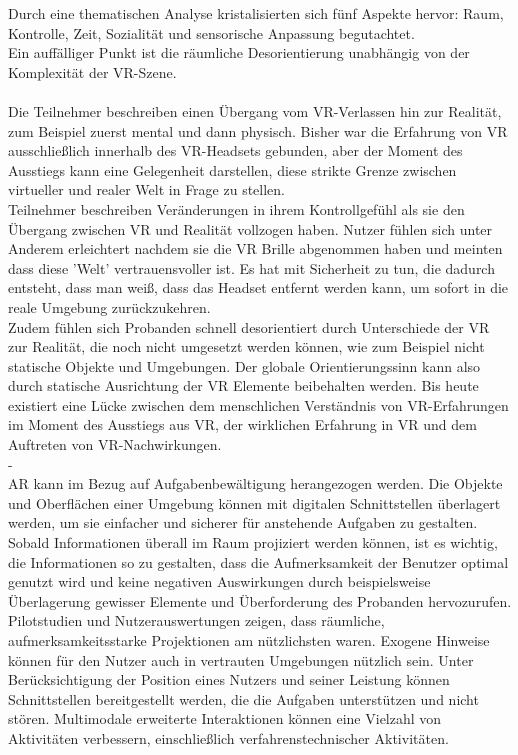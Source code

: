 Durch eine thematischen Analyse kristalisierten sich fünf Aspekte hervor: Raum, Kontrolle, Zeit, Sozialität und sensorische Anpassung begutachtet.\\
Ein auffälliger Punkt ist die räumliche Desorientierung unabhängig von der Komplexität der VR-Szene.\\ \\
 Die Teilnehmer beschreiben einen Übergang vom VR-Verlassen hin zur Realität, zum Beispiel zuerst mental und dann physisch.
Bisher war die Erfahrung von VR ausschließlich innerhalb des VR-Headsets gebunden, aber der Moment des Ausstiegs kann eine Gelegenheit darstellen, diese strikte Grenze zwischen virtueller und realer Welt in Frage zu stellen.\\
Teilnehmer beschreiben Veränderungen in ihrem Kontrollgefühl als sie den Übergang zwischen VR und Realität vollzogen haben. Nutzer fühlen sich unter Anderem erleichtert nachdem sie die VR Brille abgenommen haben und meinten dass diese 'Welt' vertrauensvoller ist. Es hat mit Sicherheit zu tun, die dadurch entsteht, dass man weiß, dass das Headset entfernt werden kann, um sofort in die reale Umgebung zurückzukehren.\\
Zudem fühlen sich Probanden schnell desorientiert durch Unterschiede der VR zur Realität, die noch nicht umgesetzt werden können, wie zum Beispiel nicht statische Objekte und Umgebungen. Der globale Orientierungssinn kann also durch statische Ausrichtung der VR Elemente beibehalten werden.
Bis heute existiert eine Lücke zwischen dem menschlichen Verständnis von VR-Erfahrungen im Moment des Ausstiegs aus VR, der wirklichen Erfahrung in VR und dem Auftreten von VR-Nachwirkungen. \cite{knibbe2018dream}\\


-\cite{bonanni2005attention}\\
AR kann im Bezug auf Aufgabenbewältigung herangezogen werden. 
Die Objekte und Oberflächen einer Umgebung können mit digitalen Schnittstellen überlagert werden, um sie einfacher und sicherer für anstehende Aufgaben zu gestalten. Sobald Informationen überall im Raum projiziert werden können, ist es wichtig, die Informationen so zu gestalten, dass die Aufmerksamkeit der Benutzer optimal genutzt wird und keine negativen Auswirkungen durch beispielsweise Überlagerung gewisser Elemente und Überforderung des Probanden hervozurufen. Pilotstudien und Nutzerauswertungen zeigen, dass räumliche, aufmerksamkeitsstarke Projektionen am nützlichsten waren. Exogene Hinweise können für den Nutzer auch in vertrauten Umgebungen nützlich sein. Unter Berücksichtigung der Position eines Nutzers und seiner Leistung können Schnittstellen bereitgestellt werden, die die Aufgaben unterstützen und nicht stören. Multimodale erweiterte Interaktionen können eine Vielzahl von Aktivitäten verbessern, einschließlich verfahrenstechnischer Aktivitäten.\\

